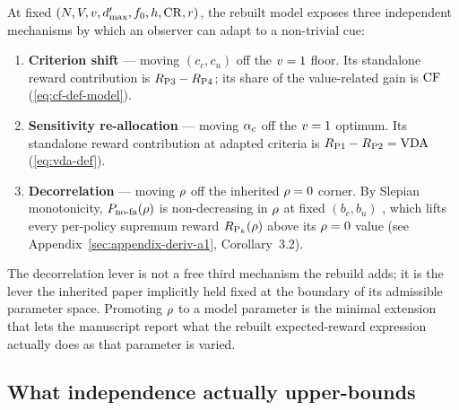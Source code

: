 \begin{definition}
\label{def:three-levers}
At fixed $(N, V, v, d'_{\max}, f_0, h, \mathrm{CR}, r)$, the
rebuilt model exposes three independent mechanisms by which an
observer can adapt to a non-trivial cue:
\begin{enumerate}
\item \textbf{Criterion shift} — moving $(c_c, c_u)$ off the
  $v = 1$ floor. Its standalone reward contribution is
  $R_{\mathrm{P3}} - R_{\mathrm{P4}}$; its share of the value-related gain is
  $\mathrm{CF}$ (\ref{eq:cf-def-model}).
\item \textbf{Sensitivity re-allocation} — moving $\alpha_c$ off
  the $v = 1$ optimum. Its standalone reward contribution at
  adapted criteria is $R_{\mathrm{P1}} - R_{\mathrm{P2}} = \mathrm{VDA}$
  (\ref{eq:vda-def}).
\item \textbf{Decorrelation} — moving $\rho$ off the inherited
  $\rho = 0$ corner. By Slepian monotonicity,
  $P_{\mathrm{no\text{-}fa}}(\rho)$ is non-decreasing in $\rho$ at fixed
  $(b_c, b_u)$ \cite{Slepian1962}, which lifts every per-policy
  supremum reward $R_{\text{P}_k}(\rho)$ above its
  $\rho = 0$ value (see Appendix~\ref{sec:appendix-deriv-a1},
  Corollary~3.2).
\end{enumerate}
\end{definition}

The decorrelation lever is not a free third mechanism the rebuild
adds; it is the lever the inherited paper implicitly held fixed at
the boundary of its admissible parameter space. Promoting $\rho$ to
a model parameter is the minimal extension that lets the
manuscript report what the rebuilt expected-reward expression
actually does as that parameter is varied.

\subsection{What independence actually upper-bounds}
\label{sec:model-upper-bound}


